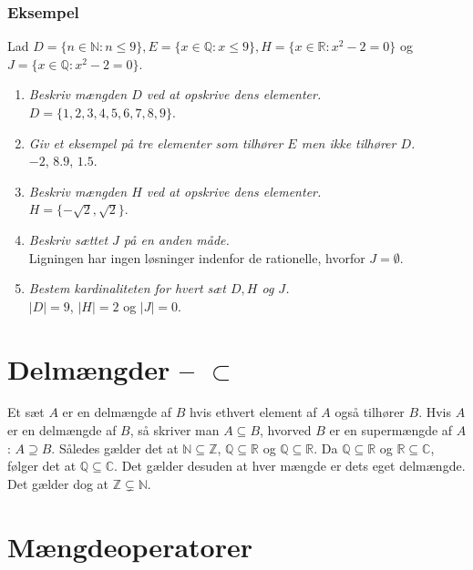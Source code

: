 \subsubsection{Eksempel}
Lad $D=\{n\in\mathbb{N}:n\leq 9\}, E=\{x\in\mathbb{Q}:x\leq9\}, H=\{x\in\mathbb{R}:x^2-2=0\}$ og $J=\{x\in\mathbb{Q}:x^2-2=0\}$.
\begin{enumerate}
    \item \textit{Beskriv mængden $D$ ved at opskrive dens elementer.}\\ $D=\{1,2,3,4,5,6,7,8,9\}$.
    \item \textit{Giv et eksempel på tre elementer som tilhører $E$ men ikke tilhører $D$.}\\$-2$, $8.9$, $1.5$.
    \item \textit{Beskriv mængden $H$ ved at opskrive dens elementer.}\\ $H=\{-\sqrt{2}, \sqrt{2}\}$.
    \item \textit{Beskriv sættet $J$ på en anden måde.}\\Ligningen har ingen løsninger indenfor de rationelle, hvorfor $J=\emptyset$.
    \item \textit{Bestem kardinaliteten for hvert sæt $D, H$ og $J$.}\\ $|D|=9$, $|H|=2$ og $|J|=0$.
\end{enumerate}
\section{Delmængder \texorpdfstring{-- $\subset$}{}}
Et sæt $A$ er en delmængde af $B$ hvis ethvert element af $A$ også tilhører $B$. Hvis $A$ er en delmængde af $B$, så skriver man $A\subseteq B$, hvorved $B$ er en supermængde af $A$: $A\supseteq B$. Således gælder det at $\mathbb{N}\subseteq \mathbb{Z}$, $\mathbb{Q}\subseteq \mathbb{R}$ og $\mathbb{Q}\subseteq \mathbb{R}$. Da $\mathbb{Q}\subseteq \mathbb{R}$ og $\mathbb{R}\subseteq \mathbb{C}$, følger det at $\mathbb{Q}\subseteq \mathbb{C}$. Det gælder desuden at hver mængde er dets eget delmængde. Det gælder dog at $\mathbb{Z}\subsetneq \mathbb{N}$.
\section{Mængdeoperatorer}


